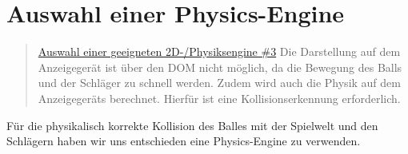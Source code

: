 \section{Auswahl einer Physics-Engine}

\begin{quote}
	\href{https://github.com/Transport-Protocol/MBC-Ping-Pong/issues/3}{Auswahl einer geeigneten 2D-/Physiksengine \#3}
	\newline
	Die Darstellung auf dem Anzeigegerät ist über den DOM nicht möglich, da die Bewegung des Balls und der Schläger zu schnell werden. Zudem wird auch die Physik auf dem Anzeigegeräts berechnet. Hierfür ist eine Kollisionserkennung erforderlich.
\end{quote}
Für die physikalisch korrekte Kollision des Balles mit der Spielwelt und den Schlägern haben wir uns entschieden eine Physics-Engine zu verwenden.

